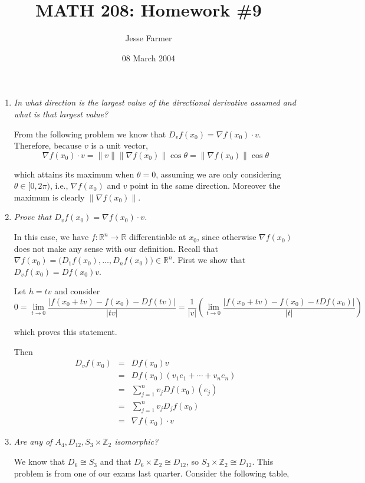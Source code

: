 \documentclass[11pt]{article}
\title{MATH 208: Homework \#9}
\author{Jesse Farmer}
\date{08 March 2004}
\begin{document}
\maketitle
\begin{enumerate}

\item \emph{In what direction is the largest value of the directional derivative assumed and what is that largest value?}

From the following problem we know that $D_vf(x_0) = \nabla f(x_0) \cdot v$.  Therefore, because $v$ is a unit vector,
\[
\nabla f(x_0) \cdot v = \|v\| \|\nabla f(x_0)\| \cos \theta = \|\nabla f(x_0)\| \cos \theta
\]

which attains its maximum when $\theta = 0$, assuming we are only considering $\theta \in [0, 2\pi)$, i.e., $\nabla f(x_0)$ and $v$ point in the same direction.  Moreover the maximum is clearly $\|\nabla f(x_0)\|$.
\item \emph{Prove that $D_vf(x_0) = \nabla f(x_0) \cdot v$.}

In this case, we have $f: \mathbb{R}^n \rightarrow \mathbb{R}$ differentiable at $x_0$, since otherwise $\nabla f(x_0)$ does not make any sense with our definition.  Recall that $\nabla f(x_0) = \big(D_1f(x_0), \ldots, D_nf(x_0)\big) \in \mathbb{R}^n$.  First we show that $D_vf(x_0) = Df(x_0)v$.

Let $h = tv$ and consider
\[
0 = \lim_{t \rightarrow 0}\frac{|f(x_0 + tv) - f(x_0) - Df(tv)|}{|tv|} = \frac{1}{|v|}\left(\lim_{t \rightarrow 0}\frac{|f(x_0 + tv) - f(x_0) - tDf(x_0)|}{|t|}\right)
\]

which proves this statement.

Then
\begin{eqnarray*}
D_vf(x_0) &=& Df(x_0)v \\
&=& Df(x_0)(v_1e_1 + \cdots + v_ne_n) \\
&=& \sum_{j=1}^n v_jDf(x_0)(e_j) \\
&=& \sum_{j=1}^n v_jD_jf(x_0) \\
&=& \nabla f(x_0) \cdot v
\end{eqnarray*}

\newpage

\item \emph{Are any of $A_4, D_{12}, S_3 \times \mathbb{Z}_2$ isomorphic?}

We know that $D_6 \cong S_3$ and that $D_6 \times \mathbb{Z}_2 \cong D_{12}$, so $S_3 \times \mathbb{Z}_2 \cong D_{12}$.  This problem is from one of our exams last quarter.  Consider the following table,


\end{enumerate}
\end{document}
